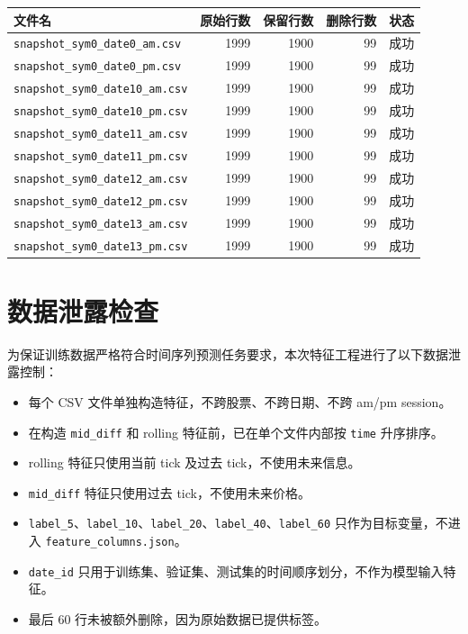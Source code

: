 \documentclass[UTF8,a4paper,12pt]{ctexart}
\begin{document}
\begin{longtable}{p{6.3cm}rrrr}
\toprule
\textbf{文件名} & \textbf{原始行数} & \textbf{保留行数} & \textbf{删除行数} & \textbf{状态} \\
\midrule
\texttt{snapshot\_sym0\_date0\_am.csv} & 1999 & 1900 & 99 & 成功 \\
\texttt{snapshot\_sym0\_date0\_pm.csv} & 1999 & 1900 & 99 & 成功 \\
\texttt{snapshot\_sym0\_date10\_am.csv} & 1999 & 1900 & 99 & 成功 \\
\texttt{snapshot\_sym0\_date10\_pm.csv} & 1999 & 1900 & 99 & 成功 \\
\texttt{snapshot\_sym0\_date11\_am.csv} & 1999 & 1900 & 99 & 成功 \\
\texttt{snapshot\_sym0\_date11\_pm.csv} & 1999 & 1900 & 99 & 成功 \\
\texttt{snapshot\_sym0\_date12\_am.csv} & 1999 & 1900 & 99 & 成功 \\
\texttt{snapshot\_sym0\_date12\_pm.csv} & 1999 & 1900 & 99 & 成功 \\
\texttt{snapshot\_sym0\_date13\_am.csv} & 1999 & 1900 & 99 & 成功 \\
\texttt{snapshot\_sym0\_date13\_pm.csv} & 1999 & 1900 & 99 & 成功 \\
\bottomrule
\end{longtable}

\section{数据泄露检查}

为保证训练数据严格符合时间序列预测任务要求，本次特征工程进行了以下数据泄露控制：

\begin{itemize}
  \item 每个 CSV 文件单独构造特征，不跨股票、不跨日期、不跨 am/pm session。
  \item 在构造 \texttt{mid\_diff} 和 rolling 特征前，已在单个文件内部按 \texttt{time} 升序排序。
  \item rolling 特征只使用当前 tick 及过去 tick，不使用未来信息。
  \item \texttt{mid\_diff} 特征只使用过去 tick，不使用未来价格。
  \item \texttt{label\_5}、\texttt{label\_10}、\texttt{label\_20}、\texttt{label\_40}、\texttt{label\_60} 只作为目标变量，不进入 \texttt{feature\_columns.json}。
  \item \texttt{date\_id} 只用于训练集、验证集、测试集的时间顺序划分，不作为模型输入特征。
  \item 最后 60 行未被额外删除，因为原始数据已提供标签。
\end{itemize}
\end{document}
